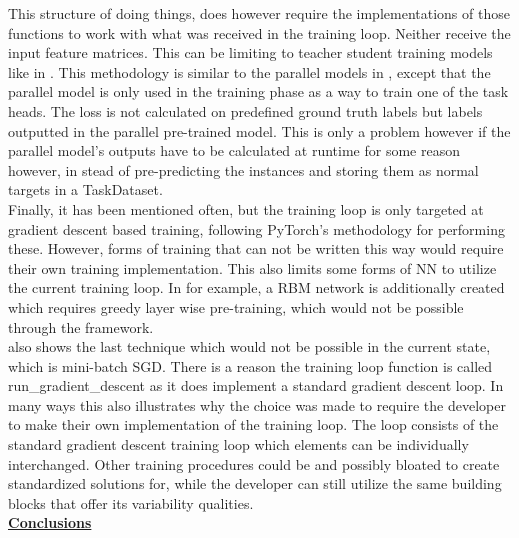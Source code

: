 This structure of doing things, does however require the implementations of those functions to work with what was received in the training loop. Neither receive the input feature matrices. This can be limiting to teacher student training models like in \cite{imoto2020sound}. This methodology is similar to the parallel models in \cite{wu2020domain}, except that the parallel model is only used in the training phase as a way to train one of the task heads. The loss is not calculated on predefined ground truth labels but labels outputted in the parallel pre-trained model. This is only a problem however if the parallel model's outputs have to be calculated at runtime for some reason however, in stead of pre-predicting the instances and storing them as normal targets in a TaskDataset. \\

Finally, it has been mentioned often, but the training loop is only targeted at gradient descent based training, following PyTorch's methodology for performing these. However, forms of training that can not be written this way would require their own training implementation. This also limits some forms of NN to utilize the current training loop. In \cite{georgiev2017heterogeneous} for example, a RBM network is additionally created which requires greedy layer wise pre-training, which would not be possible through the framework.\\

\cite{georgiev2017heterogeneous} also shows the last technique which would not be possible in the current state, which is mini-batch SGD. There is a reason the training loop function is called run\_gradient\_descent as it does implement a standard gradient descent loop. In many ways this also illustrates why the choice was made to require the developer to make their own implementation of the training loop. The loop consists of the standard gradient descent training loop which elements can be individually interchanged. Other training procedures could be and possibly bloated to create standardized solutions for, while the developer can still utilize the same building blocks that offer its variability qualities.\\

\underline{\textbf{Conclusions}}









